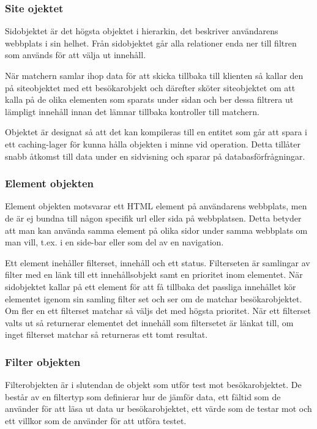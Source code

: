 \subsubsection{Site ojektet}

Sidobjektet är det högsta objektet i hierarkin, det beskriver användarens webbplats i sin helhet. Från sidobjektet går alla relationer enda ner till filtren som används för att välja ut innehåll.

När matchern samlar ihop data för att skicka tillbaka till klienten så kallar den på siteobjektet med ett besökarobjekt och därefter sköter siteobjektet om att kalla på de olika elementen som sparats under sidan och ber dessa filtrera ut lämpligt innehåll innan det lämnar tillbaka kontroller till matchern.

Objektet är designat så att det kan kompileras till en entitet som går att spara i ett caching-lager för kunna hålla objekten i minne vid operation. Detta tillåter snabb åtkomst till data under en sidvisning och sparar på databasförfrågningar.

\subsubsection{Element objekten}

Element objekten motsvarar ett HTML element på användarens webbplats, men de är ej bundna till någon specifik url eller sida på webbplatsen. Detta betyder att man kan använda samma element på olika sidor under samma webbplats om man vill, t.ex. i en side-bar eller som del av en navigation.

Ett element inehåller filterset, innehåll och ett status. Filterseten är samlingar av filter med en länk till ett innehållsobjekt samt en prioritet inom elementet. När sidobjektet kallar på ett element för att få tillbaka det passliga innehållet kör elementet igenom sin samling filter set och ser om de matchar besökarobjektet. Om fler en ett filterset matchar så väljs det med högsta prioritet. När ett filterset valts ut så returnerar elementet det innehåll som filtersetet är länkat till, om inget filterset matchar så returneras ett tomt resultat.

\subsubsection{Filter objekten}

Filterobjekten är i slutendan de objekt som utför test mot besökarobjektet. De består av en filtertyp som definierar hur de jämför data, ett fältid som de använder för att läsa ut data ur besökarobjektet, ett värde som de testar mot och ett villkor som de använder för att utföra testet.

